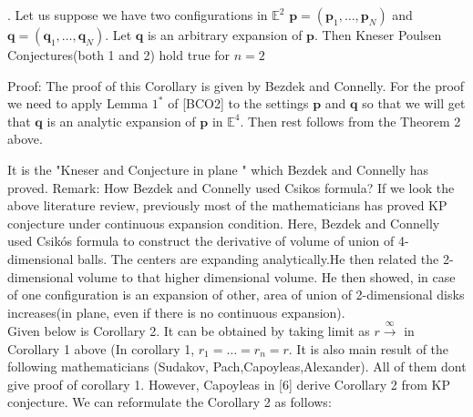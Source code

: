 . Let us suppose  we have two configurations in $\mathbb{E}^{2}$ $\boldsymbol{p}=\left(\boldsymbol{p}_{1}, \ldots, \boldsymbol{p}_{N}\right)$ and $\boldsymbol{q}=\left(\boldsymbol{q}_{1}, \ldots, \boldsymbol{q}_{N}\right)$. Let  $\boldsymbol{q}$ is an arbitrary expansion of $\boldsymbol{p}$. Then Kneser Poulsen Conjectures(both 1 and 2) hold true for $n=2$
    \item Proof: The  proof of this Corollary is given by Bezdek and Connelly. For the proof we need to apply Lemma $1^*$ of [BCO2]  to the settings $\boldsymbol{p}$ and $\boldsymbol{q}$ so that we will  get that $\boldsymbol{q}$ is an analytic expansion of $\boldsymbol{p}$ in $\mathbb{E}^{4}$. Then rest follows from the Theorem 2 above.
    \item  It is the "Kneser and Conjecture in plane " which Bezdek and Connelly has proved.
Remark: How Bezdek and Connelly used Csikos formula?
 If we look the above literature review, previously most of the mathematicians has proved KP conjecture under continuous expansion condition. Here, Bezdek and Connelly used  Csikós formula to construct the derivative of volume of  union of 4-dimensional balls. The centers are expanding analytically.He then related the 2-dimensional volume to that higher dimensional volume. He then showed, in case of one configuration is an expansion of other,  area of union of 2-dimensional disks increases(in plane, even if there is no continuous expansion).  \\

























Given below is Corollary 2. It can be obtained by taking limit as $r \xrightarrow{\infty}$ in Corollary 1 above (In corollary 1, $r_1=\dots = r_n = r$. It is also main result of the following mathematicians (Sudakov, Pach,Capoyleas,Alexander). All of them dont give proof of corollary 1. However, Capoyleas in [6] derive Corollary 2 from KP conjecture. We can reformulate the Corollary 2 as follows:
